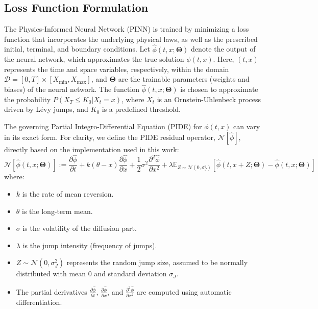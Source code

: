 \documentclass[11pt,twoside,openright]{report}
\begin{document}
\subsection{Loss Function Formulation} \label{sec:loss_function}

The Physics-Informed Neural Network (PINN) is trained by minimizing a loss function that incorporates the underlying physical laws, as well as the prescribed initial, terminal, and boundary conditions. Let $\hat{\phi}(t, x; \mathbf{\Theta})$ denote the output of the neural network, which approximates the true solution $\phi(t,x)$. Here, $(t,x)$ represents the time and space variables, respectively, within the domain $\mathcal{D} = [0, T] \times [X_{\text{min}}, X_{\text{max}}]$, and $\mathbf{\Theta}$ are the trainable parameters (weights and biases) of the neural network. The function $\hat{\phi}(t,x; \mathbf{\Theta})$ is chosen to approximate the probability $P(X_T \le K_0 | X_t = x)$, where $X_t$ is an Ornstein-Uhlenbeck process driven by L\'evy jumps, and $K_0$ is a predefined threshold.

The governing Partial Integro-Differential Equation (PIDE) for $\phi(t,x)$ can vary in its exact form. For clarity, we define the PIDE residual operator, $\mathcal{N}[\hat{\phi}]$, directly based on the implementation used in this work:
\begin{equation}
\mathcal{N}[\hat{\phi}(t,x; \mathbf{\Theta})] := \frac{\partial \hat{\phi}}{\partial t} + k(\theta - x) \frac{\partial \hat{\phi}}{\partial x} + \frac{1}{2}\sigma^2 \frac{\partial^2 \hat{\phi}}{\partial x^2} + \lambda \mathbb{E}_{Z \sim \mathcal{N}(0,\sigma_J^2)}[\hat{\phi}(t, x+Z; \mathbf{\Theta}) - \hat{\phi}(t, x; \mathbf{\Theta})]
\label{eq:pinn_pide_residual}
\end{equation}
where:
\begin{itemize}
    \item $k$ is the rate of mean reversion.
    \item $\theta$ is the long-term mean.
    \item $\sigma$ is the volatility of the diffusion part.
    \item $\lambda$ is the jump intensity (frequency of jumps).
    \item $Z \sim \mathcal{N}(0, \sigma_J^2)$ represents the random jump size, assumed to be normally distributed with mean 0 and standard deviation $\sigma_J$.
    \item The partial derivatives $\frac{\partial \hat{\phi}}{\partial t}$, $\frac{\partial \hat{\phi}}{\partial x}$, and $\frac{\partial^2 \hat{\phi}}{\partial x^2}$ are computed using automatic differentiation.
\end{itemize}
\end{document}
